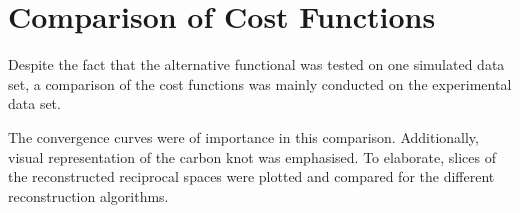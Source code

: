 \section{Comparison of Cost Functions}

Despite the fact that the alternative functional was tested on one simulated data set,
a comparison of the cost functions was mainly conducted on the experimental data set.

The convergence curves were of importance in this comparison.
Additionally, visual representation of the carbon knot was emphasised.
To elaborate, slices of the reconstructed reciprocal spaces were plotted and compared for the different reconstruction algorithms.